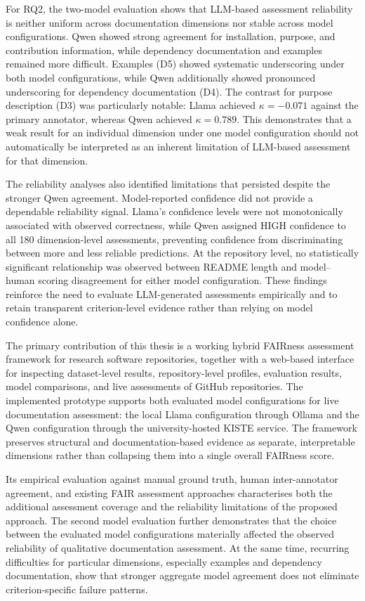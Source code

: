 For RQ2, the two-model evaluation shows that LLM-based assessment
reliability is neither uniform across documentation dimensions nor
stable across model configurations. Qwen showed strong agreement for
installation, purpose, and contribution information, while dependency
documentation and examples remained more difficult. Examples (D5)
showed systematic underscoring under both model configurations, while
Qwen additionally showed pronounced underscoring for dependency
documentation (D4). The contrast for purpose description (D3) was
particularly notable: Llama achieved $\kappa=-0.071$ against the
primary annotator, whereas Qwen achieved $\kappa=0.789$. This
demonstrates that a weak result for an individual dimension under one
model configuration should not automatically be interpreted as an
inherent limitation of LLM-based assessment for that dimension.

The reliability analyses also identified limitations that persisted
despite the stronger Qwen agreement. Model-reported confidence did
not provide a dependable reliability signal. Llama's confidence
levels were not monotonically associated with observed correctness,
while Qwen assigned HIGH confidence to all 180 dimension-level
assessments, preventing confidence from discriminating between more
and less reliable predictions. At the repository level, no
statistically significant relationship was observed between README
length and model--human scoring disagreement for either model
configuration. These findings reinforce the need to evaluate
LLM-generated assessments empirically and to retain transparent
criterion-level evidence rather than relying on model confidence
alone.

The primary contribution of this thesis is a working hybrid FAIRness
assessment framework for research software repositories, together
with a web-based interface for inspecting dataset-level results,
repository-level profiles, evaluation results, model comparisons,
and live assessments of GitHub repositories. The implemented
prototype supports both evaluated model configurations for live
documentation assessment: the local Llama configuration through
Ollama and the Qwen configuration through the university-hosted
KISTE service. The framework preserves structural and
documentation-based evidence as separate, interpretable dimensions
rather than collapsing them into a single overall FAIRness score.

Its empirical evaluation against manual ground truth,
human inter-annotator agreement, and existing FAIR assessment
approaches characterises both the additional assessment coverage and
the reliability limitations of the proposed approach. The second
model evaluation further demonstrates that the choice between the
evaluated model configurations materially affected the observed
reliability of qualitative documentation assessment.
At the same time, recurring difficulties for particular dimensions,
especially examples and dependency documentation, show that stronger
aggregate model agreement does not eliminate criterion-specific
failure patterns.

